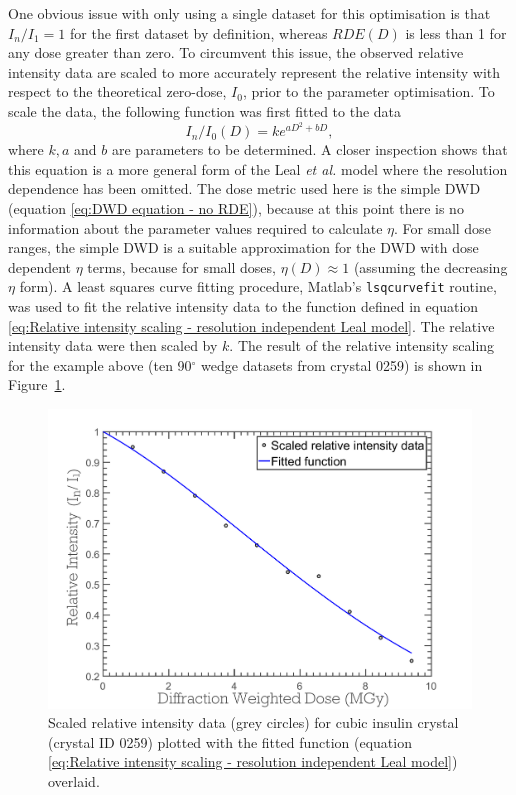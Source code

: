 One obvious issue with only using a single dataset for this optimisation is that $I_n/I_1 = 1$ for the first dataset by definition, whereas $RDE(D)$ is less than 1 for any dose greater than zero.
To circumvent this issue, the observed relative intensity data are scaled to more accurately represent the relative intensity with respect to the theoretical zero-dose, $I_0$, prior to the parameter optimisation.
To scale the data, the following function was first fitted to the data
\begin{equation}
    I_n/I_0(D) = k e^{aD^2 + bD},
    \label{eq:Relative intensity scaling - resolution independent Leal model}
\end{equation}
where $k, a$ and $b$ are parameters to be determined.
A closer inspection shows that this equation is a more general form of the Leal \textit{et al.} model where the resolution dependence has been omitted.
The dose metric used here is the simple DWD (equation \ref{eq:DWD equation - no RDE}), because at this point there is no information about the parameter values required to calculate $\eta$.
For small dose ranges, the simple DWD is a suitable approximation for the DWD with dose dependent $\eta$ terms, because for small doses, $\eta(D) \approx 1$ (assuming the decreasing $\eta$ form).
A least squares curve fitting procedure, Matlab's \verb+lsqcurvefit+ routine, was used to fit the relative intensity data to the function defined in equation \ref{eq:Relative intensity scaling - resolution independent Leal model}.
The relative intensity data were then scaled by $k$.
The result of the relative intensity scaling for the example above (ten 90$^{\circ}$ wedge datasets from crystal 0259) is shown in Figure~\ref{fig:Scaled relative intensity data - ZDE}.
\begin{figure}
  \centering
    \includegraphics[width=1\textwidth]{figures/zde/ScaledFunctionFitPlot.pdf}
    \caption[Scaled relative intensity decay.]{Scaled relative intensity data (grey circles) for cubic insulin crystal (crystal ID 0259) plotted with the fitted function (equation \ref{eq:Relative intensity scaling - resolution independent Leal model}) overlaid.}
    \label{fig:Scaled relative intensity data - ZDE}
\end{figure}
